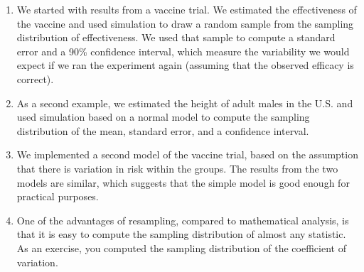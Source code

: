 \begin{enumerate}
\def\labelenumi{\arabic{enumi}.}
\item
  We started with results from a vaccine trial. We estimated the
  effectiveness of the vaccine and used simulation to draw a random
  sample from the sampling distribution of effectiveness. We used that
  sample to compute a standard error and a 90\% confidence interval,
  which measure the variability we would expect if we ran the experiment
  again (assuming that the observed efficacy is correct).
\item
  As a second example, we estimated the height of adult males in the
  U.S. and used simulation based on a normal model to compute the
  sampling distribution of the mean, standard error, and a confidence
  interval.
\item
  We implemented a second model of the vaccine trial, based on the
  assumption that there is variation in risk within the groups. The
  results from the two models are similar, which suggests that the
  simple model is good enough for practical purposes.
\item
  One of the advantages of resampling, compared to mathematical
  analysis, is that it is easy to compute the sampling distribution of
  almost any statistic. As an exercise, you computed the sampling
  distribution of the coefficient of variation.
\end{enumerate}

